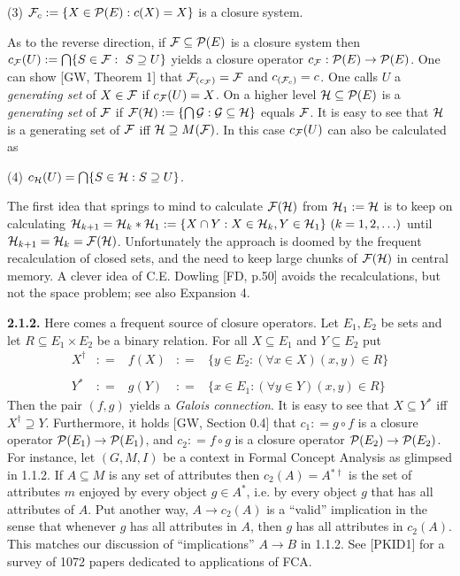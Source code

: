 \documentclass[11pt]{article}
\newcommand{\ra}{\rightarrow}
\begin{document}
(3) \quad ${\cal F}_c : = \{X \in {\cal P}(E) : c(X) = X \}$ is a closure system.

As to the reverse direction, 
if ${\cal F} \subseteq {\cal P}(E)$ is a closure system then
$c_{\cal F}(U) : = \bigcap \{S \in {\cal F}: \ S \supseteq U \}$
yields a closure operator $c_{\cal F} : {\cal P}(E) \ra {\cal P}(E)$. 
One can show [GW, Theorem 1] that ${\cal F}_{(c_{\cal F})} = {\cal F}$ and $c_{({\cal F}_c)} = c$. One calls $U$ a {\it generating set} of $X \in {\cal F}$ if $c_{\cal F} (U) = X$. On a higher level ${\cal H} \subseteq {\cal P}(E)$ is a {\it generating set} of ${\cal F}$ if ${\cal F} ({\cal H}) : = \{\bigcap {\cal G}: {\cal G} \subseteq {\cal H}\}$ equals ${\cal F}$. It is easy to see that ${\cal H}$ is a generating set of ${\cal F}$ iff ${\cal H} \supseteq M({\cal F})$. In this case
$c_{\cal F}(U)$ can also be calculated as 

(4) \quad $c_{\cal H}(U) = \bigcap \{S \in{\cal H}: S \supseteq U\}$.


The first idea that springs to mind to calculate ${\cal F}({\cal H})$ from ${\cal H}_1 : = {\cal H}$ is to keep on calculating ${\cal H}_{k+1} = {\cal H}_k \ast {\cal H}_1 : = \{X \cap Y : X \in {\cal H}_k, Y \in {\cal H}_1\} \ (k  = 1, 2, \ldots)$ until ${\cal H}_{k+1} = {\cal H}_k = {\cal F}({\cal H})$. Unfortunately the approach is doomed by the frequent recalculation of closed sets, and the need to keep large chunks of ${\cal F}({\cal H})$ in central memory. A clever idea of C.E. Dowling [FD, p.50] avoids the recalculations, but not the space problem; see also Expansion 4. 



{\bf 2.1.2.} Here comes a frequent source of closure operators. Let $E_1, E_2$ be sets and let $R \subseteq E_1 \times E_2$ be a binary relation. 
For all $X \subseteq E_1$ and $Y \subseteq E_2$ put 
$$\begin{array}{lllll}
X^\dagger & : = & f(X) & : = & \{y \in E_2: (\forall x \in X) (x,y) \in R\}\\
\\
Y^\ast & : = & g(Y) & : =& \{x \in E_1: (\forall y \in Y) (x,y) \in R\} \end{array}$$
Then the pair $(f, g)$ yields a {\it Galois connection}. It is easy to see that $X \subseteq Y^\ast$ iff $X^\dagger \supseteq Y$. Furthermore, it holds [GW, Section 0.4] that $c_1 : = g \circ f$ is a closure operator ${\cal P}(E_1) \ra {\cal P}(E_1)$, and $c_2 : =f \circ g$ is a closure operator ${\cal P}(E_2) \ra {\cal P}(E_2)$.  
For instance, let $(G, M, I)$ be a context in Formal Concept Analysis as glimpsed in 1.1.2. If $A \subseteq M$ is any set of attributes then $c_2(A) = A{^{\ast \dagger}}$ is the set of attributes $m$ enjoyed by every object $g \in A^\ast$, i.e. by every object $g$ that has all attributes of $A$.  Put another way, $A \ra c_2(A)$ is a ``valid'' implication in the sense that whenever $g$ has all attributes in $A$, then $g$ has all attributes in $c_2(A)$. This matches our discussion of ``implications'' $A \ra B$ in 1.1.2. See [PKID1] for a survey of 1072 papers dedicated to applications of FCA.
\end{document}

